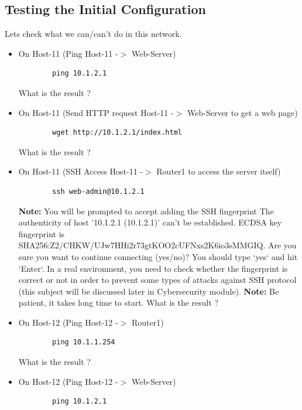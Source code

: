 \subsection{Testing the Initial Configuration}\label{Testing the Initial Configuration}
Lets check what we can/can't do in this network.
\newline
\begin{itemize}
	\item On Host-11 (Ping Host-11 -$>$ Web-Server)
	\begin{verbatim}
	    ping 10.1.2.1
	\end{verbatim}

	What is the result ?
	\item On Host-11 (Send HTTP request Host-11 -$>$ Web-Server to get a web page)
	\begin{verbatim}
	    wget http://10.1.2.1/index.html
	\end{verbatim}

	What is the result ?
	\item On Host-11 (SSH Access Host-11 -$>$ Router1 to access the server itself)
	\begin{verbatim}
	    ssh web-admin@10.1.2.1
	\end{verbatim}

	\textbf{Note:} You will be prompted to accept adding the SSH fingerprint
	\newline
	The authenticity of host '10.1.2.1 (10.1.2.1)' can't be established.
	ECDSA key fingerprint is SHA256:Z2/CHKW/UJw7HHi2r73gtKOO2cUFNxs2K6io3sMMGIQ.
	Are you sure you want to continue connecting (yes/no)?
	You should type `yes` and hit `Enter`. In a real environment, you need to check whether the fingerprint is correct or not in order to prevent some types of attacks against SSH protocol (this subject will be discussed later in Cybersecurity module).
	\newline
	\newline
	\textbf{Note:} Be patient, it takes long time to start.
	\newline
	\newline
	What is the result ?
	\item On Host-12 (Ping Host-12 -$>$ Router1)
	\begin{verbatim}
	    ping 10.1.1.254
	\end{verbatim}

	What is the result ?

	\item On Host-12 (Ping Host-12 -$>$ Web-Server)
	\begin{verbatim}
	    ping 10.1.2.1
	\end{verbatim}


\end{itemize}
